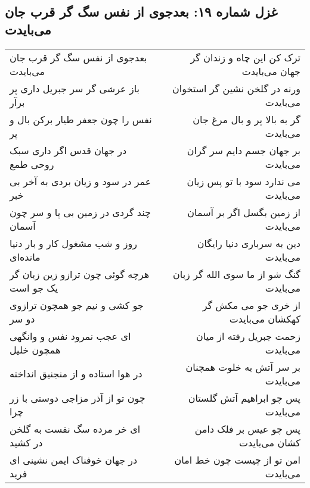 \begin{center}
\section*{غزل شماره ۱۹: بعدجوی از نفس سگ گر قرب جان می‌بایدت}
\label{sec:019}
\begin{longtable}{l p{0.5cm} r}
بعدجوی از نفس سگ گر قرب جان می‌بایدت
&&
ترک کن این چاه و زندان گر جهان می‌بایدت
\\
باز عرشی گر سر جبریل داری پر برآر
&&
ورنه در گلخن نشین گر استخوان می‌بایدت
\\
نفس را چون جعفر طیار برکن بال و پر
&&
گر به بالا پر و بال مرغ جان می‌بایدت
\\
در جهان قدس اگر داری سبک روحی طمع
&&
بر جهان جسم دایم سر گران می‌بایدت
\\
عمر در سود و زیان بردی به آخر بی خبر
&&
می ندارد سود با تو پس زیان می‌بایدت
\\
چند گردی در زمین بی پا و سر چون آسمان
&&
از زمین بگسل اگر بر آسمان می‌بایدت
\\
روز و شب مشغول کار و بار دنیا مانده‌ای
&&
دین به سرباری دنیا رایگان می‌بایدت
\\
هرچه گوئی چون ترازو زین زبان گر یک جو است
&&
گنگ شو از ما سوی الله گر زبان می‌بایدت
\\
جو کشی و نیم جو همچون ترازوی دو سر
&&
از خری جو می مکش گر کهکشان می‌بایدت
\\
ای عجب نمرود نفس و وانگهی همچون خلیل
&&
زحمت جبریل رفته از میان می‌بایدت
\\
در هوا استاده و از منجنیق انداخته
&&
بر سر آتش به خلوت همچنان می‌بایدت
\\
چون تو از آذر مزاجی دوستی با زر چرا
&&
پس چو ابراهیم آتش گلستان می‌بایدت
\\
ای خر مرده سگ نفست به گلخن در کشید
&&
پس چو عیس بر فلک دامن کشان می‌بایدت
\\
در جهان خوفناک ایمن نشینی ای فرید
&&
امن تو از چیست چون خط امان می‌بایدت
\\
\end{longtable}
\end{center}
